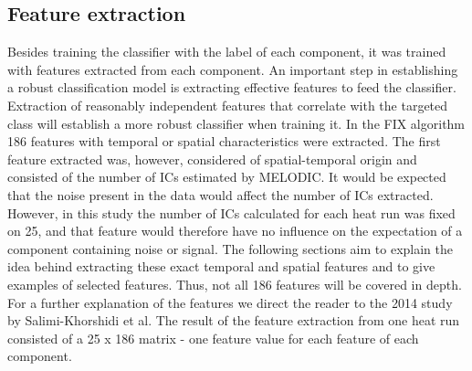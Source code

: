 \subsection{Feature extraction}
Besides training the classifier with the label of each component, it was trained with features extracted from each component. An important step in establishing a robust classification model is extracting effective features to feed the classifier. Extraction of reasonably independent features that correlate with the targeted class will establish a more robust classifier when training it. In the FIX algorithm 186 features with temporal or spatial characteristics were extracted. The first feature extracted was, however, considered of spatial-temporal origin and consisted of the number of ICs estimated by MELODIC. It would be expected that the noise present in the data would affect the number of ICs extracted. \cite{Salimi-Khorshidi2014} However, in this study the number of ICs calculated for each heat run was fixed on 25, and that feature would therefore have no influence on the expectation of a component containing noise or signal. 
The following sections aim to explain the idea behind extracting these exact temporal and spatial features and to give examples of selected features. Thus, not all 186 features will be covered in depth. For a further explanation of the features we direct the reader to the 2014 study by Salimi-Khorshidi et al. \cite{Salimi-Khorshidi2014} The result of the feature extraction from one heat run consisted of a 25 x 186 matrix - one feature value for each feature of each component.

